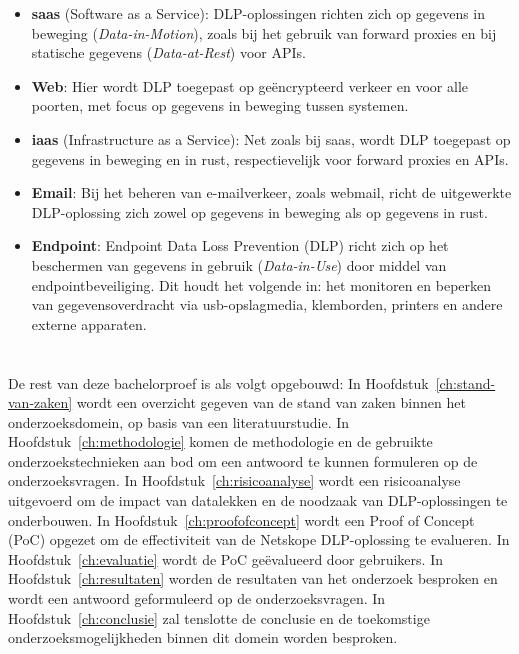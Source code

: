 \begin{itemize}
\item \textbf{\gls{saas}} (Software as a Service): DLP-oplossingen richten zich op gegevens in beweging (\textit{Data-in-Motion}), zoals bij het gebruik van forward proxies en bij statische gegevens (\textit{Data-at-Rest}) voor APIs.
\item \textbf{Web}: Hier wordt DLP toegepast op geëncrypteerd verkeer en voor alle poorten, met focus op gegevens in beweging tussen systemen.
\item \textbf{\gls{iaas}} (Infrastructure as a Service): Net zoals bij \gls{saas}, wordt DLP toegepast op gegevens in beweging en in rust, respectievelijk voor forward proxies en APIs.
\item \textbf{Email}: Bij het beheren van e-mailverkeer, zoals webmail, richt de uitgewerkte DLP-oplossing zich zowel op gegevens in beweging als op gegevens in rust.
\item \textbf{Endpoint}: Endpoint Data Loss Prevention (DLP) richt zich op het beschermen van gegevens in gebruik (\textit{Data-in-Use}) door middel van endpointbeveiliging. Dit houdt het volgende in: het monitoren en beperken van gegevensoverdracht via \gls{usb}-opslagmedia, klemborden, printers en andere externe apparaten.
\end{itemize}



\section{}%
\label{sec:opzet-bachelorproef}

De rest van deze bachelorproef is als volgt opgebouwd: 
In Hoofdstuk~\ref{ch:stand-van-zaken} wordt een overzicht gegeven van de stand van zaken binnen het onderzoeksdomein, op basis van een literatuurstudie. 
In Hoofdstuk~\ref{ch:methodologie} komen de methodologie en de gebruikte onderzoekstechnieken aan bod om een antwoord te kunnen formuleren op de onderzoeksvragen. 
In Hoofdstuk~\ref{ch:risicoanalyse} wordt een risicoanalyse uitgevoerd om de impact van datalekken en de noodzaak van DLP-oplossingen te onderbouwen. 
In Hoofdstuk~\ref{ch:proofofconcept} wordt een Proof of Concept (PoC) opgezet om de effectiviteit van de Netskope DLP-oplossing te evalueren. 
In Hoofdstuk~\ref{ch:evaluatie} wordt de PoC geëvalueerd door gebruikers. 
In Hoofdstuk~\ref{ch:resultaten} worden de resultaten van het onderzoek besproken en wordt een antwoord geformuleerd op de onderzoeksvragen. 
In Hoofdstuk~\ref{ch:conclusie} zal tenslotte de conclusie en de toekomstige onderzoeksmogelijkheden binnen dit domein worden besproken. 

